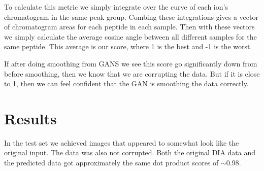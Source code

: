 \documentclass[12pt]{article}
\begin{document}
{To calculate this metric we simply integrate over the curve of each ion's chromatogram in the same peak group. Combing these integrations gives a vector of chromatogram areas for each peptide in each sample. Then with these vectors we simply calculate the average cosine angle between all different samples for the same peptide. This average is our score, where 1 is the best and -1 is the worst.

If after doing smoothing from GANS we see this score go significantly down from before smoothing, then we know that we are corrupting the data. But if it is close to 1, then we can feel confident that the GAN is smoothing the data correctly. 
\section{Results}

In the test set we achieved images that appeared to somewhat look like the original input. The data was also not corrupted. Both the original DIA data and the predicted data got approximately the same dot product scores of $\sim 0.98$. 

}
\end{document}
